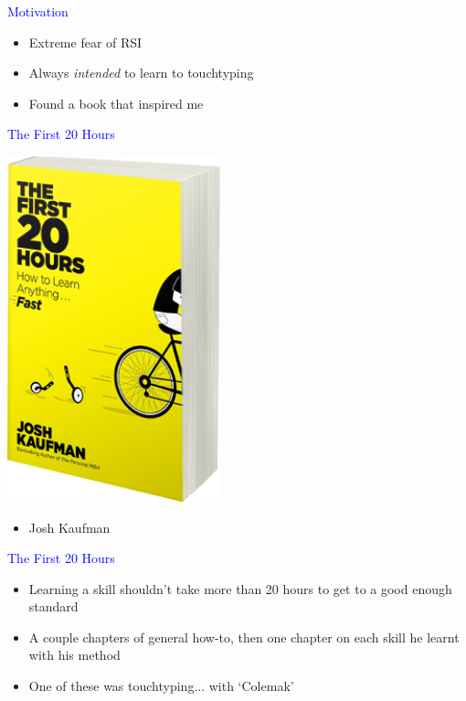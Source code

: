 \documentclass[landscape]{slides}
\begin{document}
\begin{slide}

    \textcolor{blue}{\Large{Motivation}}

    \begin{itemize}
        \item Extreme fear of RSI
        \item Always \emph{intended} to learn to touchtyping
        \item Found a book that inspired me
    \end{itemize}

\end{slide}


\begin{slide}

    \textcolor{blue}{\Large{The First 20 Hours}}

    \includegraphics[height=10cm]{first20hours-cover}

    \begin{itemize}
        \item Josh Kaufman
    \end{itemize}

\end{slide}

\begin{slide}

    \textcolor{blue}{\Large{The First 20 Hours}}

    \begin{itemize}
        \item Learning a skill shouldn't take more than 20 hours to get to a good enough standard
        \item A couple chapters of general how-to, then one chapter on each skill he learnt with his method
        \item One of these was touchtyping... with `Colemak'
    \end{itemize}

\end{slide}
\end{document}
